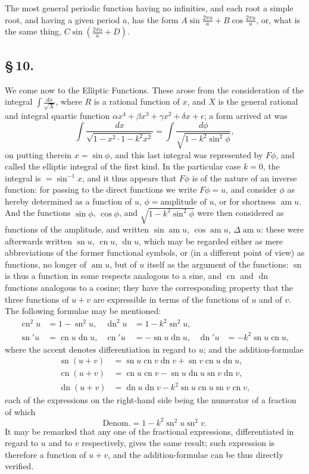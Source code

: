 \documentclass[11pt,a4paper]{article}
\DeclareMathOperator{\am}{am}
\DeclareMathOperator{\sn}{sn}
\DeclareMathOperator{\cn}{cn}
\DeclareMathOperator{\dn}{dn}
\begin{document}
The most general periodic function having no infinities, and each root a simple root, and having a given period $a$, has the form $A\sin\frac{2\pi u}{a} + B\cos\frac{2\pi u}{a}$, or, what is the same thing, $C\sin\left(\frac{2\pi u}{a} + D\right)$.

\subsection*{\S\,10.}

We come now to the Elliptic Functions. These arose from the consideration of the integral $\int\frac{dx}{\sqrt{X}}$, where $R$ is a rational function of $x$, and $X$ is the general rational and integral quartic function $\alpha x^{4} + \beta x^{3} + \gamma x^{2} + \delta x + \epsilon$; a form arrived at was
\[
\int\frac{dx}{\sqrt{1 - x^{2} \cdot 1 - k^{2}x^{2}}} = \int\frac{d\phi}{\sqrt{1 - k^{2}\sin^{2}\phi}},
\]
on putting therein $x = \sin\phi$, and this last integral was represented by $F\phi$, and called the elliptic integral of the first kind. In the particular case $k = 0$, the integral is $= \sin^{-1}x$, and it thus appears that $F\phi$ is of the nature of an inverse function: for passing to the direct functions we write $F\phi = u$, and consider $\phi$ as hereby determined as a function of $u$, $\phi = \text{amplitude of } u$, or for shortness $\am u$. And the functions $\sin\phi$, $\cos\phi$, and $\sqrt{1 - k^{2}\sin^{2}\phi}$ were then considered as functions of the amplitude, and written $\sin\am u$, $\cos\am u$, $\Delta\am u$: these were afterwards written $\sn u$, $\cn u$, $\dn u$, which may be regarded either as mere abbreviations of the former functional symbols, or (in a different point of view) as functions, no longer of $\am u$, but of $u$ itself as the argument of the functions: $\sn$ is thus a function in some respects analogous to a sine, and $\cn$ and $\dn$ functions analogous to a cosine; they have the corresponding property that the three functions of $u + v$ are expressible in terms of the functions of $u$ and of $v$. The following formulae may be mentioned:
\begin{align*}
\cn^{2}u &= 1 - \sn^{2}u, & \dn^{2}u &= 1 - k^{2}\sn^{2}u, \\
\sn' u &= \cn u \dn u, & \cn' u &= -\sn u \dn u, & \dn' u &= -k^{2}\sn u \cn u,
\end{align*}
where the accent denotes differentiation in regard to $u$; and the addition-formulae
\begin{align*}
\sn(u + v) &= \sn u \cn v \dn v + \sn v \cn u \dn u, \\
\cn(u + v) &= \cn u \cn v - \sn u \dn u \sn v \dn v, \\
\dn(u + v) &= \dn u \dn v - k^{2}\sn u \cn u \sn v \cn v,
\end{align*}
each of the expressions on the right-hand side being the numerator of a fraction of which
\[
\text{Denom.} = 1 - k^{2}\sn^{2}u \sn^{2}v.
\]
It may be remarked that any one of the fractional expressions, differentiated in regard to $u$ and to $v$ respectively, gives the same result; such expression is therefore a function of $u + v$, and the addition-formulae can be thus directly verified.
\end{document}

